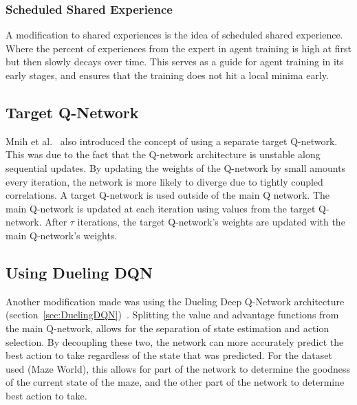 \documentclass[12pt,american]{report}
\providecommand{\DIFaddtex}[1]{{\protect\color{blue}\uwave{#1}}} %
\providecommand{\DIFaddbegin}{} %
\providecommand{\DIFaddend}{} %
\providecommand{\DIFadd}[1]{\texorpdfstring{\DIFaddtex{#1}}{#1}} %
\newcommand{\DIFaddincludegraphics}[2][]{{\color{blue}\fbox{\DIFOincludegraphics[#1]{#2}}}} %
\DeclareRobustCommand{\DIFaddbegin}{\DIFOaddbegin \let\includegraphics\DIFaddincludegraphics} %
\DeclareRobustCommand{\DIFaddend}{\DIFOaddend \let\includegraphics\DIFOincludegraphics} %
\begin{document}
\subsubsection{Scheduled Shared Experience \DIFaddbegin \DIFadd{Replay}\DIFaddend }
A modification to shared experiences is the idea of scheduled shared experience.  Where the percent of experiences from the expert in agent training is high at first but then slowly decays over time.  This serves as a guide for agent training in its early stages, and ensures that the training does not hit a local minima early. 


\subsection{Target Q-Network}
Mnih et al.~\cite{atari} also introduced the concept of using a separate target Q-network.  This was due to the fact that the Q-network architecture is unstable along sequential updates.  By updating the weights of the Q-network by small amounts every iteration, the network is more likely to diverge due to tightly coupled correlations.  A target Q-network is used outside of the main Q network.  The main Q-network is updated at each iteration using values from the target Q-network.  After $\tau$ iterations, the target Q-network's weights are updated with the main Q-network's weights. 
\subsection{Using Dueling DQN}
Another modification made was using the Dueling Deep Q-Network architecture (section~\ref{sec:DuelingDQN})~\cite{wang2015dueling}.  Splitting the value and advantage functions from the main Q-network, allows for the separation of state estimation and action selection.  By decoupling these two, the network can more accurately predict the best action to take regardless of the state that was predicted. For the dataset used (Maze World), this allows for part of the network to determine the goodness of the current state of the maze, and the other part of the network to determine best action to take. 
\end{document}
